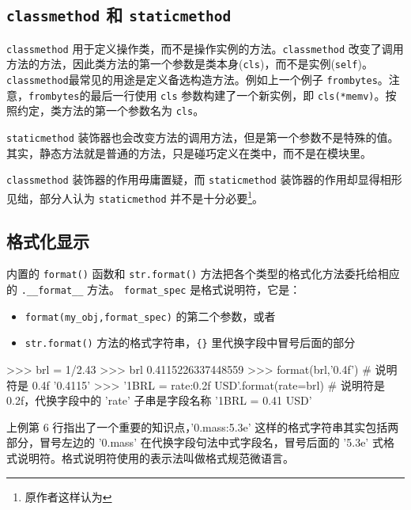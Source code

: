 \subsection{\texttt{classmethod} 和 \texttt{staticmethod}}

\texttt{classmethod} 用于定义操作类，而不是操作实例的方法。\texttt{classmethod} 改变了调用方法的方法，因此类方法的第一个参数是类本身(\texttt{cls})，而不是实例(\texttt{self})。\texttt{classmethod}最常见的用途是定义备选构造方法。例如上一个例子 \texttt{frombytes}。注意，\texttt{frombytes}的最后一行使用 \texttt{cls} 参数构建了一个新实例，即 \texttt{cls(*memv)}。按照约定，类方法的第一个参数名为 \texttt{cls}。

\texttt{staticmethod} 装饰器也会改变方法的调用方法，但是第一个参数不是特殊的值。其实，静态方法就是普通的方法，只是碰巧定义在类中，而不是在模块里。



\texttt{classmethod} 装饰器的作用毋庸置疑，而 \texttt{staticmethod} 装饰器的作用却显得相形见绌，部分人认为 \texttt{staticmethod} 并不是十分必要\footnote{原作者这样认为}。

\subsection{格式化显示}

内置的 \texttt{format()} 函数和 \texttt{str.format()} 方法把各个类型的格式化方法委托给相应的 \texttt{.\_\_format\_\_} 方法。 \texttt{format\_spec} 是格式说明符，它是：

\begin{itemize}
    \item \texttt{format(my\_obj,format\_spec)} 的第二个参数，或者
    \item \texttt{str.format()} 方法的格式字符串，\texttt{\{\}} 里代换字段中冒号后面的部分
\end{itemize}

\begin{python}
>>> brl = 1/2.43
>>> brl
0.4115226337448559
>>> format(brl,'0.4f')      # 说明符是 0.4f
'0.4115'
>>> '1BRL = {rate:0.2f} USD'.format(rate=brl)   # 说明符是 0.2f，代换字段中的 'rate' 子串是字段名称
'1BRL = 0.41 USD'
\end{python}

上例第 6 行指出了一个重要的知识点，'{0.mass:5.3e}' 这样的格式字符串其实包括两部分，冒号左边的 '0.mass' 在代换字段句法中式字段名，冒号后面的 '5.3e' 式格式说明符。格式说明符使用的表示法叫做格式规范微语言。

